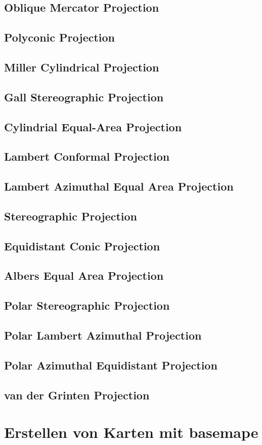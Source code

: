 \documentclass[a4paper,10pt]{article}
\begin{document}
\subsection{Oblique Mercator Projection}
\label{sec:2.17}
\subsection{Polyconic Projection}
\label{sec:2.18}
\subsection{Miller Cylindrical Projection}
\label{sec:2.19}
\subsection{Gall Stereographic Projection}
\label{sec:2.20}
\subsection{Cylindrial Equal-Area Projection}
\label{sec:2.21}
\subsection{Lambert Conformal Projection}
\label{sec:2.22}
\subsection{Lambert Azimuthal Equal Area Projection}
\label{sec:2.23}
\subsection{Stereographic Projection}
\label{sec:2.24}
\subsection{Equidistant Conic Projection}
\label{sec:2.25}
\subsection{Albers Equal Area Projection}
\label{sec:2.26}
\subsection{Polar Stereographic Projection}
\label{sec:2.27}
\subsection{Polar Lambert Azimuthal Projection}
\label{sec:2.28}
\subsection{Polar Azimuthal Equidistant Projection}
\label{sec:2.29}
\subsection{van der Grinten Projection}
\label{sec:2.30}
\section{Erstellen von Karten mit basemape}
\label{sec:3}
\end{document}
